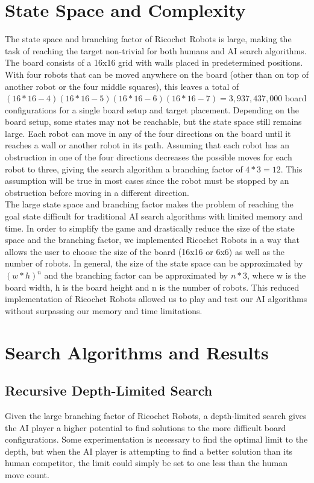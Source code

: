 \documentclass[a4paper,10pt]{article}
\begin{document}
\section{State Space and Complexity}
\label{sec:stateSpace}
The state space and branching factor of Ricochet Robots is large, making the task of reaching the target non-trivial for both humans and AI search algorithms. The board consists of a 16x16 grid with walls placed in predetermined positions.  With four robots that can be moved anywhere on the board (other than on top of another robot or the four middle squares), this leaves a total of $(16*16-4)(16*16-5)(16*16-6)(16*16-7) = 3,937,437,000$ board configurations for a single board setup and target placement.  Depending on the board setup, some states may not be reachable, but the state space still remains large. Each robot can move in any of the four directions on the board until it reaches a wall or another robot in its path.  Assuming that each robot has an obstruction in one of the four directions decreases the possible moves for each robot to three, giving the search algorithm a branching factor of $4*3 = 12$.  This assumption will be true in most cases since the robot must be stopped by an obstruction before moving in a different direction. \\
The large state space and branching factor makes the problem of reaching the goal state difficult for traditional AI search algorithms with limited memory and time. In order to simplify the game and drastically reduce the size of the state space and the branching factor, we implemented Ricochet Robots in a way that allows the user to choose the size of the board (16x16 or 6x6) as well as the number of robots. In general, the size of the state space can be approximated by $(w*h)^n$ and the branching factor can be approximated by $n*3$, where w is the board width, h is the board height and n is the number of robots.  This reduced implementation of Ricochet Robots allowed us to play and test our AI algorithms without surpassing our memory and time limitations.


\section{Search Algorithms and Results}
\label{sec:searchAlgorithms}
  \subsection{Recursive Depth-Limited Search} \label{recursiveDFS}
  Given the large branching factor of Ricochet Robots, a depth-limited search gives the AI player a higher potential to find solutions to the more difficult board configurations.  Some experimentation is necessary to find the optimal limit to the depth, but when the AI player is attempting to find a better solution than its human competitor, the limit could simply be set to one less than the human move count. \\
\end{document}
